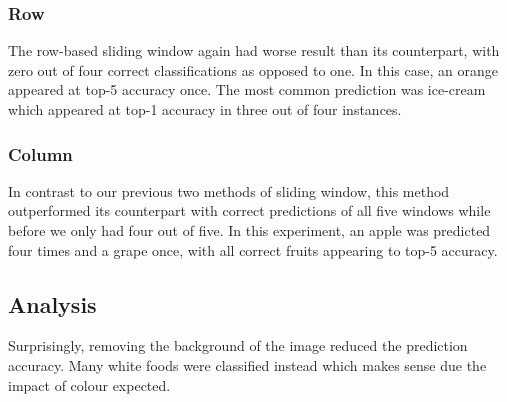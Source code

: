 \tocless\subsubsection{Row}
The row-based sliding window again had worse result than its counterpart, with
zero out of four correct classifications as opposed to one. In this case, an
orange appeared at top-5 accuracy once. The most common prediction was ice-cream
which appeared at top-1 accuracy in three out of four instances.

\tocless\subsubsection{Column}
In contrast to our previous two methods of sliding window, this method
outperformed its counterpart with correct predictions of all five windows while
before we only had four out of five. In this experiment, an apple was predicted
four times and a grape once, with all correct fruits appearing to top-5
accuracy.

\tocless\subsection{Analysis}
Surprisingly, removing the background of the image reduced the prediction
accuracy.
Many white foods were classified instead which makes sense due
the impact of colour expected.
